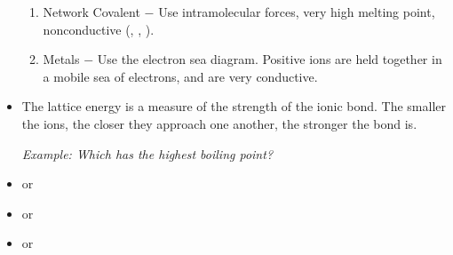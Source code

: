 \documentclass[12pt]{article}
\begin{document}
\begin{itemize}
\begin{enumerate}
    \item Network Covalent $-$ Use intramolecular forces, very high melting point, nonconductive (, , ).

    \item Metals $-$ Use the electron sea diagram. Positive ions are held together in a mobile sea of electrons, and are very conductive.

  \end{enumerate}

\item The lattice energy is a measure of the strength of the ionic bond. The smaller the ions, the closer they approach one another, the stronger the bond is.

  \textit{Example: Which has the highest boiling point?}

\item \underline{} or 

\item {} or \underline{}

\item \underline{} or 

\end{itemize}
\end{document}
